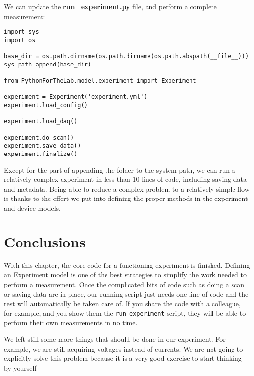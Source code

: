 We can update the \textbf{run\_experiment.py} file, and perform a complete measurement:

\begin{verbatim}
import sys
import os

base_dir = os.path.dirname(os.path.dirname(os.path.abspath(__file__)))
sys.path.append(base_dir)

from PythonForTheLab.model.experiment import Experiment

experiment = Experiment('experiment.yml')
experiment.load_config()

experiment.load_daq()

experiment.do_scan()
experiment.save_data()
experiment.finalize()
\end{verbatim}

Except for the part of appending the folder to the system path, we can run a relatively complex experiment in less than 10 lines of code, including saving data and metadata. Being able to reduce a complex problem to a relatively simple flow is thanks to the effort we put into defining the proper methods in the experiment and device models.

\section{Conclusions}\label{section:experiment-model-conclusions}
With this chapter, the core code for a functioning experiment is finished. Defining an Experiment model is one of the best strategies to simplify the work needed to perform a measurement. Once the complicated bits of code such as doing a scan or saving data are in place, our running script just needs one line of code and the rest will automatically be taken care of. If you share the code with a colleague, for example, and you show them the \texttt{run\_experiment} script, they will be able to perform their own measurements in no time.

We left still some more things that should be done in our experiment. For example, we are still acquiring voltages instead of currents. We are not going to explicitly solve this problem because it is a very good exercise to start thinking by yourself


